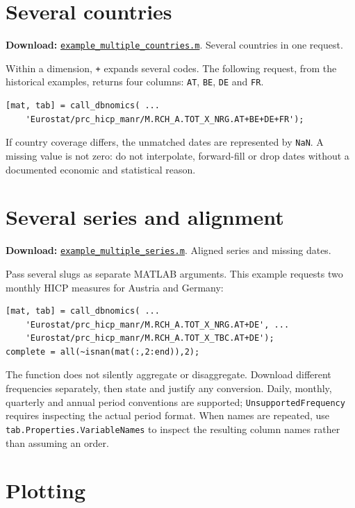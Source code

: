 \documentclass[a4paper,12pt]{article}
\begin{document}
\section{Several countries}

\noindent\textbf{Download:} \href{https://raw.githubusercontent.com/Vermandel/dbnomics-teaching/1ff66c0c5d96b06556e5c0a202877cdc4a117d74/examples/example_multiple_countries.m}{\texttt{example\_multiple\_countries.m}}. Several countries in one request.

Within a dimension, \texttt{+} expands several codes. The following request,
from the historical examples, returns four columns: \texttt{AT}, \texttt{BE},
\texttt{DE} and \texttt{FR}.
\begin{verbatim}
[mat, tab] = call_dbnomics( ...
    'Eurostat/prc_hicp_manr/M.RCH_A.TOT_X_NRG.AT+BE+DE+FR');
\end{verbatim}
If country coverage differs, the unmatched dates are represented by
\texttt{NaN}. A missing value is not zero: do not interpolate, forward-fill or
drop dates without a documented economic and statistical reason.

\section{Several series and alignment}

\noindent\textbf{Download:} \href{https://raw.githubusercontent.com/Vermandel/dbnomics-teaching/1ff66c0c5d96b06556e5c0a202877cdc4a117d74/examples/example_multiple_series.m}{\texttt{example\_multiple\_series.m}}. Aligned series and missing dates.

Pass several slugs as separate MATLAB arguments. This example requests two
monthly HICP measures for Austria and Germany:
\begin{verbatim}
[mat, tab] = call_dbnomics( ...
    'Eurostat/prc_hicp_manr/M.RCH_A.TOT_X_NRG.AT+DE', ...
    'Eurostat/prc_hicp_manr/M.RCH_A.TOT_X_TBC.AT+DE');
complete = all(~isnan(mat(:,2:end)),2);
\end{verbatim}
The function does not silently aggregate or disaggregate. Download different
frequencies separately, then state and justify any conversion. Daily, monthly, quarterly and annual period conventions are supported; \texttt{UnsupportedFrequency} requires inspecting the actual period format. When names are
repeated, use \texttt{tab.Properties.VariableNames} to inspect the resulting
column names rather than assuming an order.

\clearpage
\section{Plotting}
\end{document}
